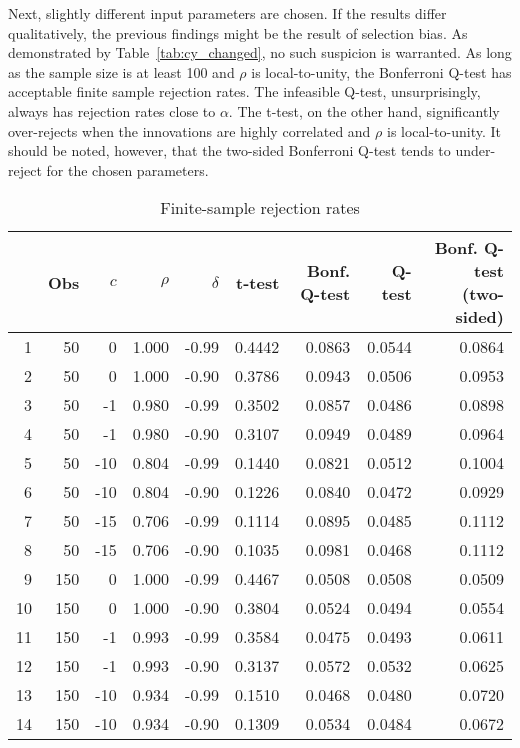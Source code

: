 \documentclass{article}
\begin{document}
Next, slightly different input parameters are chosen. If the results differ qualitatively, the previous findings might be the result of selection bias. As demonstrated by Table~\vref{tab:cy_changed}, no such suspicion is warranted. As long as the sample size is at least 100 and $\rho$ is local-to-unity, the Bonferroni Q-test has acceptable finite sample rejection rates. The infeasible Q-test, unsurprisingly, always has rejection rates close to $\alpha$. The t-test, on the other hand, significantly over-rejects when the innovations are highly correlated and $\rho$ is local-to-unity. It should be noted, however, that the two-sided Bonferroni Q-test tends to under-reject for the chosen parameters. 
\begin{table}[h!]
\caption{Finite-sample rejection rates}
\centering
\label{tab:cy_changed}
\begin{threeparttable}
\begin{tabular}{rrrrrrrrr}
  \hline
 & Obs & $c$ & $\rho$ & $\delta$ & t-test & Bonf. Q-test & Q-test & Bonf. Q-test (two-sided) \\ 
  \hline
1 & 50 & 0 & 1.000 & -0.99 & 0.4442 & 0.0863 & 0.0544 & 0.0864 \\ 
  2 & 50 & 0 & 1.000 & -0.90 & 0.3786 & 0.0943 & 0.0506 & 0.0953 \\ 
  3 & 50 & -1 & 0.980 & -0.99 & 0.3502 & 0.0857 & 0.0486 & 0.0898 \\ 
  4 & 50 & -1 & 0.980 & -0.90 & 0.3107 & 0.0949 & 0.0489 & 0.0964 \\ 
  5 & 50 & -10 & 0.804 & -0.99 & 0.1440 & 0.0821 & 0.0512 & 0.1004 \\ 
  6 & 50 & -10 & 0.804 & -0.90 & 0.1226 & 0.0840 & 0.0472 & 0.0929 \\ 
  7 & 50 & -15 & 0.706 & -0.99 & 0.1114 & 0.0895 & 0.0485 & 0.1112 \\ 
  8 & 50 & -15 & 0.706 & -0.90 & 0.1035 & 0.0981 & 0.0468 & 0.1112 \\ 
  9 & 150 & 0 & 1.000 & -0.99 & 0.4467 & 0.0508 & 0.0508 & 0.0509 \\ 
  10 & 150 & 0 & 1.000 & -0.90 & 0.3804 & 0.0524 & 0.0494 & 0.0554 \\ 
  11 & 150 & -1 & 0.993 & -0.99 & 0.3584 & 0.0475 & 0.0493 & 0.0611 \\ 
  12 & 150 & -1 & 0.993 & -0.90 & 0.3137 & 0.0572 & 0.0532 & 0.0625 \\ 
  13 & 150 & -10 & 0.934 & -0.99 & 0.1510 & 0.0468 & 0.0480 & 0.0720 \\ 
  14 & 150 & -10 & 0.934 & -0.90 & 0.1309 & 0.0534 & 0.0484 & 0.0672 \\ 

\end{tabular}
\end{threeparttable}
\end{table}
\end{document}
